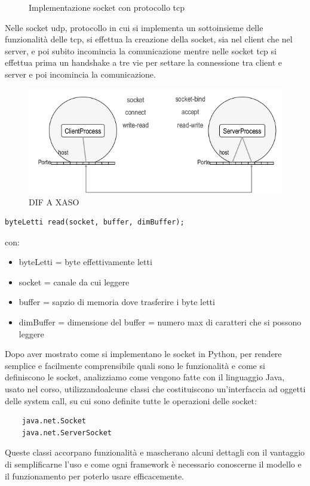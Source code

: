 \message{ !name(sd.tex)}\documentclass[a4paper,12pt, oneside]{book}
\begin{document}
\begin{figure}
    \caption{Implementazione socket con protocollo tcp}\label{tcpSocket}
    \inputminted{python}{code/tcpClient.py}
    \inputminted{python}{code/tcpServer.py}
\end{figure}
Nelle socket udp, protocollo in cui si implementa un sottoinsieme delle funzionalità delle tcp, 
si effettua la creazione della socket, sia nel client che nel server, e poi subito incomincia la 
comunicazione mentre nelle socket tcp si effettua prima un handshake a tre vie per settare la connessione
tra client e server e poi incomincia la comunicazione.

\begin{figure}
    \caption{DIF A XASO}
	\includegraphics[scale=3]{img/sc4.png}
\end{figure}

\begin{verbatim}
byteLetti read(socket, buffer, dimBuffer);
\end{verbatim}
con:
\begin{itemize}
	\item byteLetti = byte effettivamente letti
	\item socket = canale da cui leggere
	\item buffer = sapzio di memoria dove trasferire i byte letti
	\item dimBuffer = dimensione del buffer = numero max di caratteri che si possono leggere
\end{itemize}

Dopo aver mostrato come si implementano le socket in Python, per rendere semplice e facilmente comprensibile
quali sono le funzionalità e come si definiscono le socket, analizziamo come vengono fatte con il linguaggio
Java, usato nel corso, utilizzandoalcune classi che costituiscono un'interfaccia ad oggetti 
delle system call, su cui sono definite tutte le operazioni delle socket:
\begin{verbatim}
    java.net.Socket
    java.net.ServerSocket
\end{verbatim}
Queste classi accorpano funzionalità e mascherano alcuni dettagli con il vantaggio di semplificarne l'uso
e come ogni framework è necessario conoscerne il modello e il funzionamento per poterlo usare efficacemente. 
\end{document}
